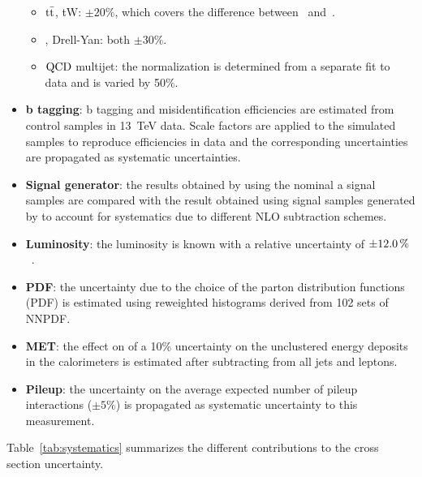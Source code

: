\begin{itemize}
\begin{itemize}
\item $\mathrm{t}\bar{\mathrm{t}}$, tW: $\pm 20\%$, which covers the difference between~\cite{Kidonakis:2012db} and~\cite{Cacciari:2011hy}.
\item \wjets, Drell-Yan: both $\pm 30\%$.
\item $\rm QCD$ multijet: the normalization is determined from a separate fit to data and is varied by 50$\%$. 
\end{itemize} 
\item  \textbf{b tagging}:  b tagging and misidentification efficiencies are estimated from control samples in 13~TeV data. Scale factors are applied to the simulated samples to reproduce efficiencies in data and the corresponding uncertainties are propagated as systematic uncertainties.
\item \textbf{Signal generator}: the results obtained by using the nominal a{\MCATNLO} signal samples are compared with the result obtained using 
signal samples generated by {\POWHEG} to account for systematics due to different NLO subtraction schemes.
\item \textbf{Luminosity}: the luminosity is known with a relative uncertainty of $\pm 12.0\,\%$~\cite{lumi}.
\item \textbf{PDF}: the uncertainty due to the choice of the parton distribution functions (PDF) is estimated using reweighted histograms derived from 102 sets of NNPDF.
\item \textbf{MET}: the effect on \MET of a 10\% uncertainty on the unclustered energy deposits in the calorimeters is estimated after subtracting from \MET all jets and leptons.
\item \textbf{Pileup}: the uncertainty on the average expected number of pileup interactions ($\pm 5 \%$) is propagated as systematic uncertainty to this measurement.
\end{itemize}
Table~\ref{tab:systematics} summarizes the different contributions to the cross section uncertainty.











